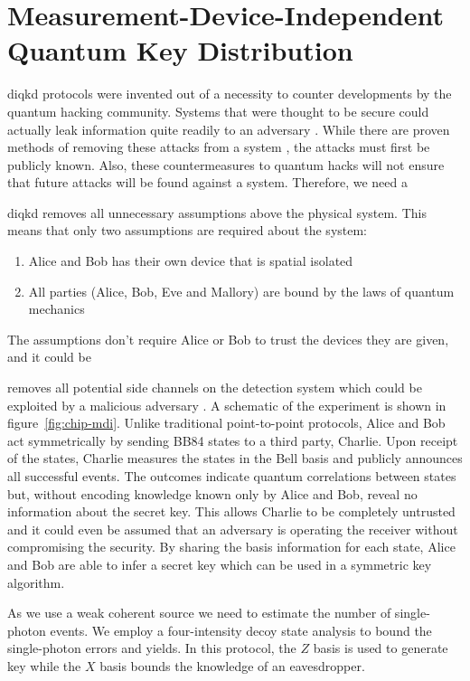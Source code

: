 \section{Measurement-Device-Independent Quantum Key Distribution}
\label{sec:mdi-qkd}

\Ac{diqkd} protocols were invented out of a necessity to counter developments by the quantum hacking community. Systems that were thought to be secure could actually leak information quite readily to an adversary \cite{}. While there are proven methods of removing these attacks from a system \cite{}, the attacks must first be publicly known. Also, these countermeasures to quantum hacks will not ensure that future attacks will be found against a system. Therefore, we need a 

\Ac{diqkd} removes all unnecessary assumptions above the physical system. This means that only two assumptions are required about the system:

\begin{enumerate}
	\item Alice and Bob has their own device that is spatial isolated
	\item All parties (Alice, Bob, Eve and Mallory) are bound by the laws of quantum mechanics
\end{enumerate}

The assumptions don't require Alice or Bob to trust the devices they are given, and it could be 

removes all potential side channels on the detection system which could be exploited by a malicious adversary \cite{mdi-qkd}. A schematic of the experiment is shown in figure~\ref{fig:chip-mdi}. Unlike traditional point-to-point protocols, Alice and Bob act symmetrically by sending BB84 states to a third party, Charlie. Upon receipt of the states, Charlie measures the states in the Bell basis and publicly announces all successful events. The outcomes indicate quantum correlations between states but, without encoding knowledge known only by Alice and Bob, reveal no information about the secret key. This allows Charlie to be completely untrusted and it could even be assumed that an adversary is operating the receiver without compromising the security. By sharing the basis information for each state, Alice and Bob are able to infer a secret key which can be used in a symmetric key algorithm. 

As we use a weak coherent source we need to estimate the number of single-photon events. We employ a four-intensity decoy state analysis \cite{zhou2016} to bound the single-photon errors and yields. In this protocol, the $Z$ basis is used to generate key while the $X$ basis bounds the knowledge of an eavesdropper. 

